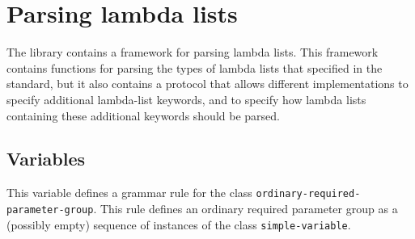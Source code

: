 \chapter{Parsing lambda lists}
\label{chap-user-parsing-lambda-lists}

The \sysname{} library contains a framework for parsing lambda lists.
This framework contains functions for parsing the types of lambda
lists that specified in the \commonlisp{} standard, but it also
contains a protocol that allows different implementations to specify
additional lambda-list keywords, and to specify how lambda lists
containing these additional keywords should be parsed.

\section{Variables}


This variable defines a grammar rule for the class
\texttt{ordinary-required-parameter-group}.  This rule defines an
ordinary required parameter group as a (possibly empty) sequence of
instances of the class \texttt{simple-variable}.

















